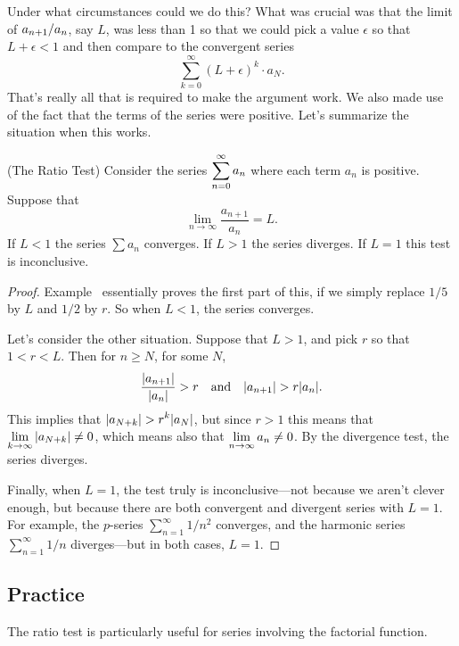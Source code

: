 Under what circumstances could we do this? What was crucial was that
the limit of $\displaystyle a_{n+1}/a_n$, say $L$, was less than 1 so that we
could pick a value $\epsilon$ so that $L + \epsilon < 1$ and then
compare to the convergent series
$$
\sum_{k=0}^\infty (L + \epsilon)^k \cdot a_N.
$$
That's really all that is required to make the argument work. We also
made use of the fact that the terms of the series were positive.
  Let's summarize the
situation when this works.

\begin{theorem} (The Ratio Test)
Consider the series $\displaystyle\sum_{n=0}^\infty a_n$ where each term $a_n$ is positive.
Suppose that
$$
\lim_{n\to \infty} \frac{a_{n+1}}{a_n}=L.
$$
If $L<1$ the series $\sum a_n$ converges.  If $L>1$ the
series diverges.  If $L=1$ this test is inconclusive.
\end{theorem}

\begin{proof}
  Example~ essentially proves
  the first part of this, if we simply replace $1/5$ by $L$ and $1/2$
  by $r$.  So when $L< 1$, the series converges.

Let's consider the other situation.  Suppose that $L>1$, and pick $r$
so that $1<r<L$.  Then for $n\ge N$, for some $N$,
$${|a_{n+1}|\over |a_n|} > r \hbox{\quad and\quad} |a_{n+1}| > r|a_n|.$$
This implies that $\ds |a_{N+k}|>r^k|a_N|$, but since $r>1$ this means
that $\displaystyle\lim_{k\to\infty}|a_{N+k}| \neq 0$, which means also that
$\displaystyle\lim_{n\to\infty}a_n \neq 0$. By the divergence test, the series
diverges.

Finally, when $L = 1$, the test truly is inconclusive---not because we
aren't clever enough, but because there are both convergent and
divergent series with $L = 1$.  For example, the $p$-series
$\sum_{n=1}^\infty 1/n^2$ converges, and the harmonic series
$\sum_{n=1}^\infty 1/n$ diverges---but in both cases, $L = 1$.
\end{proof}

\subsection{Practice}

The ratio test is particularly useful for series involving
the factorial function.

